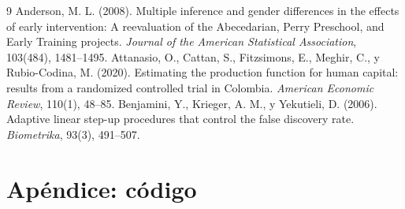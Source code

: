 \documentclass[11pt,a4paper]{article}
\begin{document}
\begin{thebibliography}{9}
 Anderson, M. L. (2008). Multiple inference and gender differences in the effects of early intervention: A reevaluation of the Abecedarian, Perry Preschool, and Early Training projects. \textit{Journal of the American Statistical Association}, 103(484), 1481--1495.
 Attanasio, O., Cattan, S., Fitzsimons, E., Meghir, C., y Rubio-Codina, M. (2020). Estimating the production function for human capital: results from a randomized controlled trial in Colombia. \textit{American Economic Review}, 110(1), 48--85.
 Benjamini, Y., Krieger, A. M., y Yekutieli, D. (2006). Adaptive linear step-up procedures that control the false discovery rate. \textit{Biometrika}, 93(3), 491--507.
\end{thebibliography}

\newpage
\appendix
\section*{Apéndice: código}

\end{document}
